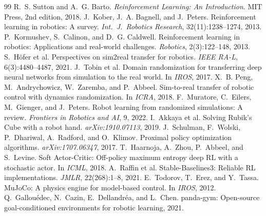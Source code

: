 \documentclass[10pt,twocolumn,letterpaper]{article}
\begin{document}
{
\footnotesize
\begin{thebibliography}{99}
 R.~S. Sutton and A.~G. Barto. \emph{Reinforcement Learning: An Introduction}. MIT Press, 2nd edition, 2018.
 J.~Kober, J.~A. Bagnell, and J.~Peters. Reinforcement learning in robotics: A survey. \emph{Int.\ J.\ Robotics Research}, 32(11):1238--1274, 2013.
 P.~Kormushev, S.~Calinon, and D.~G. Caldwell. Reinforcement learning in robotics: Applications and real-world challenges. \emph{Robotics}, 2(3):122--148, 2013.
 S.~H{\"o}fer et al. Perspectives on sim2real transfer for robotics. \emph{IEEE RA-L}, 6(3):4480--4487, 2021.
 J.~Tobin et al. Domain randomization for transferring deep neural networks from simulation to the real world. In \emph{IROS}, 2017.
 X.~B. Peng, M.~Andrychowicz, W.~Zaremba, and P.~Abbeel. Sim-to-real transfer of robotic control with dynamics randomization. In \emph{ICRA}, 2018.
 F.~Muratore, C.~Eilers, M.~Gienger, and J.~Peters. Robot learning from randomized simulations: A review. \emph{Frontiers in Robotics and AI}, 9, 2022.
 I.~Akkaya et al. Solving Rubik's Cube with a robot hand. \emph{arXiv:1910.07113}, 2019.
 J.~Schulman, F.~Wolski, P.~Dhariwal, A.~Radford, and O.~Klimov. Proximal policy optimization algorithms. \emph{arXiv:1707.06347}, 2017.
 T.~Haarnoja, A.~Zhou, P.~Abbeel, and S.~Levine. Soft Actor-Critic: Off-policy maximum entropy deep RL with a stochastic actor. In \emph{ICML}, 2018.
 A.~Raffin et al. Stable-Baselines3: Reliable RL implementations. \emph{JMLR}, 22(268):1--8, 2021.
 E.~Todorov, T.~Erez, and Y.~Tassa. MuJoCo: A physics engine for model-based control. In \emph{IROS}, 2012.
 Q.~Gallou{\'e}dec, N.~Cazin, E.~Dellandr{\'e}a, and L.~Chen. panda-gym: Open-source goal-conditioned environments for robotic learning, 2021.
\end{thebibliography}
}
\end{document}
